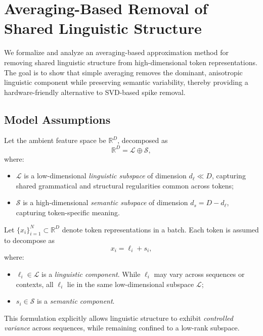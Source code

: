 \section{Averaging-Based Removal of Shared Linguistic Structure}
\label{sec:avg_remove_linguistic}

We formalize and analyze an averaging-based approximation method for removing
shared linguistic structure from high-dimensional token representations.
The goal is to show that simple averaging removes the dominant, anisotropic
linguistic component while preserving semantic variability, thereby providing
a hardware-friendly alternative to SVD-based spike removal.

\subsection{Model Assumptions}

Let the ambient feature space be $\mathbb{R}^D$, decomposed as
\[
\mathbb{R}^D = \mathcal{L} \oplus \mathcal{S},
\]
where:
\begin{itemize}
    \item $\mathcal{L}$ is a low-dimensional \emph{linguistic subspace}
          of dimension $d_\ell \ll D$, capturing shared grammatical and structural
          regularities common across tokens;
    \item $\mathcal{S}$ is a high-dimensional \emph{semantic subspace}
          of dimension $d_s = D - d_\ell$, capturing token-specific meaning.
\end{itemize}

Let $\{x_i\}_{i=1}^N \subset \mathbb{R}^D$ denote token representations in a batch.
Each token is assumed to decompose as
\begin{equation}
\label{eq:token_decomposition}
x_i = \ell_i + s_i,
\end{equation}
where:
\begin{itemize}
    \item $\ell_i \in \mathcal{L}$ is a \emph{linguistic component}.
          While $\ell_i$ may vary across sequences or contexts, all $\ell_i$
          lie in the same low-dimensional subspace $\mathcal{L}$;
    \item $s_i \in \mathcal{S}$ is a \emph{semantic component}.
\end{itemize}

This formulation explicitly allows linguistic structure to exhibit
\emph{controlled variance} across sequences, while remaining confined to a
low-rank subspace.

